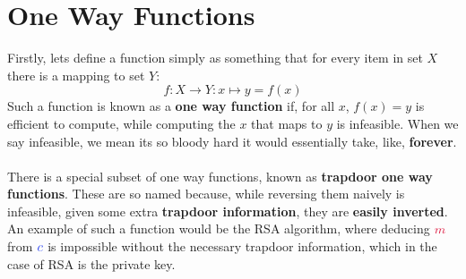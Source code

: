     \section{One Way Functions}
        Firstly, lets define a function simply as something that for every item in set $X$ there is a mapping to set $Y$:
        $$f\colon X \rightarrow Y : x \mapsto y = f(x)$$
        Such a function is known as a \textbf{one way function} if, for all $x$, $f(x) = y$ is efficient to compute, while computing the $x$ that maps to $y$ is infeasible. When we say infeasible, we mean its so bloody hard it would essentially take, like, \textbf{forever}.\\
        \\
        There is a special subset of one way functions, known as \textbf{trapdoor one way functions}. These are so named because, while reversing them naively is infeasible, given some extra \textbf{trapdoor information}, they are \textbf{easily inverted}. An example of such a function would be the RSA algorithm, where deducing $\cm$ from $\cc$ is impossible without the necessary trapdoor information, which in the case of RSA is the private key.


    
